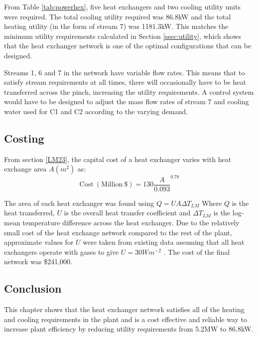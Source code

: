 From Table \ref{tab:powerhex}, five heat exchangers and two cooling utility units were required. The total cooling utility required was 86.8kW and the total heating utility (in the form of stream 7) was 1181.3kW. This matches the minimum utility requirements calculated in Section \ref{ssec:utility}, which shows that the heat exchanger network is one of the optimal configurations that can be designed.

Streams 1, 6 and 7 in the network have variable flow rates. This means that to satisfy stream requirements at all times, there will occasionally have to be heat transferred across the pinch, increasing the utility requirements. A control system would have to be designed to adjust the mass flow rates of stream 7 and cooling water used for C1 and C2 according to the varying demand.

\subsection{Costing}
From section \ref{LM23}, the capital cost of a heat exchanger varies with heat exchange area $A (m^2)$ as:
\setlength{\belowdisplayskip}{1pt} \setlength{\belowdisplayshortskip}{1pt}
\setlength{\abovedisplayskip}{1pt} \setlength{\abovedisplayshortskip}{1pt}
\begin{equation} 
\mathrm{Cost \ (Million\ \$)} = 130 \frac{A}{0.093}^{0.78}
\end{equation}

The area of each heat exchanger was found using $Q = UA\Delta T_{LM}$
Where $Q$ is the heat transferred, $U$ is the overall heat transfer coefficient and $\Delta T_{LM}$ is the log-mean temperature difference across the heat exchanger. Due to the relatively small cost of the heat exchange network compared to the rest of the plant, approximate values for $U$ were taken from existing data assuming that all heat exchangers operate with gases to give $U=30Wm^{-2}$ \cite{hexcoeff}. The cost of the final network was \$241,000. 

\subsection{Conclusion}
This chapter shows that the heat exchanger network satisfies all of the heating and cooling requirements in the plant and is a cost effective and reliable way to increase plant efficiency by reducing utility requirements from 5.2MW to 86.8kW.


%

%